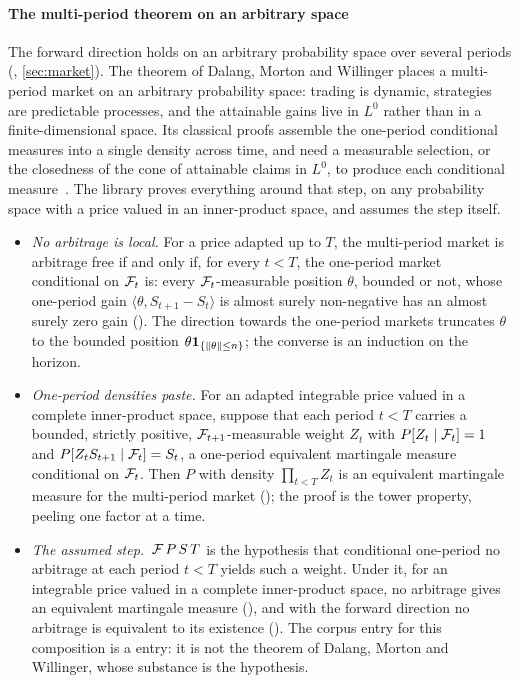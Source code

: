 \documentclass[11pt]{article}
\begin{document}
\paragraph{The multi-period theorem on an arbitrary space}
The forward direction holds on an arbitrary probability space over several periods
(, \cref{sec:market}). The theorem of Dalang, Morton and Willinger places a
multi-period market on an arbitrary probability space: trading is dynamic, strategies are predictable
processes, and the attainable gains live in $L^0$ rather than in a finite-dimensional space. Its classical
proofs assemble the one-period conditional measures into a single density across time, and need a measurable selection, or the
closedness of the cone of attainable claims in $L^0$, to produce each conditional measure~\cite{DMW1990,KabanovStricker2001}.
The library proves everything around that step, on any probability space with a price valued in an inner-product space, and assumes the step itself.
\begin{itemize}
\item \emph{No arbitrage is local.} For a price adapted up to $T$, the multi-period market is arbitrage free if and only if,
  for every $t<T$, the one-period market conditional on $\mathcal{F}_t$ is: every $\mathcal{F}_t$-measurable position $\theta$, bounded or not,
  whose one-period gain $\langle\theta,S_{t+1}-S_t\rangle$ is almost surely non-negative has an almost surely zero gain
  (). The direction towards the one-period markets truncates $\theta$ to the bounded
  position $\theta\mathbf{1}_{\{\lVert \theta\rVert\le n\}}$; the converse is an induction on the horizon.
\item \emph{One-period densities paste.} For an adapted integrable price valued in a complete inner-product space, suppose that each period $t<T$ carries a bounded, strictly
  positive, $\mathcal{F}_{t+1}$-measurable weight $Z_t$ with $P[Z_t\mid\mathcal{F}_t]=1$ and $P[Z_tS_{t+1}\mid\mathcal{F}_t]=S_t$, a one-period
  equivalent martingale measure conditional on $\mathcal{F}_t$. Then $P$ with density $\prod_{t<T}Z_t$ is an equivalent martingale measure for the
  multi-period market (); the proof is the tower property, peeling one factor at a time.
\item \emph{The assumed step.} $\,\mathcal{F}\,P\,S\,T$ is the hypothesis that conditional one-period no arbitrage
  at each period $t<T$ yields such a weight. Under it, for an integrable price valued in a complete inner-product space, no arbitrage gives
  an equivalent martingale measure
  (), and with the forward direction no arbitrage is equivalent to its
  existence (). The corpus entry for this composition is a  entry: it is not the
  theorem of Dalang, Morton and Willinger, whose substance is the hypothesis.
\end{itemize}
\end{document}
